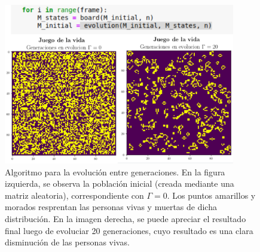 \documentclass[11pt]{iopart}
\begin{document}
\begin{figure}[h!]
\centering
\includegraphics[width = 0.9\textwidth]{Figs/final}
\caption{Algoritmo para la evolución entre generaciones. En la figura izquierda, se observa la población inicial (creada mediante una matriz aleatoria), correspondiente con $\Gamma = 0$. Los puntos amarillos y morados resprentan las personas vivas y muertas de dicha distribución. En la imagen derecha, se puede apreciar el resultado final luego de evoluciar 20 generaciones, cuyo resultado es una clara disminución de las personas vivas.  \label{fg:final}}
\end{figure}
%
\end{document}
